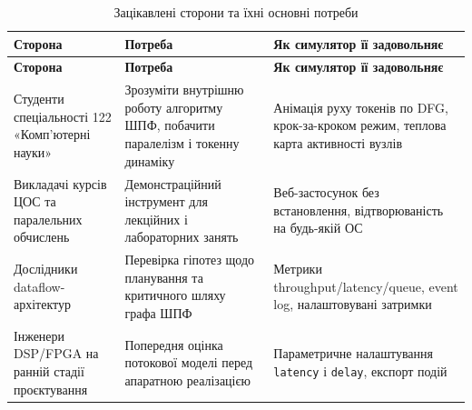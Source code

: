 \begin{longtable}[]{@{}
  >{\raggedright\arraybackslash}p{}
  >{\raggedright\arraybackslash}p{}
  >{\raggedright\arraybackslash}p{}@{}}
\caption[Зацікавлені сторони та їхні основні потреби]{Зацікавлені
сторони та їхні основні потреби}\tabularnewline
\toprule\noalign{}
\begin{minipage}[b]{\linewidth}\raggedright
\textbf{Сторона}
\end{minipage} & \begin{minipage}[b]{\linewidth}\raggedright
\textbf{Потреба}
\end{minipage} & \begin{minipage}[b]{\linewidth}\raggedright
\textbf{Як симулятор її задовольняє}
\end{minipage} \\
\midrule\noalign{}
\endfirsthead
\toprule\noalign{}
\begin{minipage}[b]{\linewidth}\raggedright
\textbf{Сторона}
\end{minipage} & \begin{minipage}[b]{\linewidth}\raggedright
\textbf{Потреба}
\end{minipage} & \begin{minipage}[b]{\linewidth}\raggedright
\textbf{Як симулятор її задовольняє}
\end{minipage} \\
\midrule\noalign{}
\endhead
\bottomrule\noalign{}
\endlastfoot
Студенти спеціальності 122 «Комп'ютерні науки» & Зрозуміти внутрішню
роботу алгоритму ШПФ, побачити паралелізм і токенну динаміку & Анімація
руху токенів по DFG, крок-за-кроком режим, теплова карта активності
вузлів \\
Викладачі курсів ЦОС та паралельних обчислень & Демонстраційний
інструмент для лекційних і лабораторних занять & Веб-застосунок без
встановлення, відтворюваність на будь-якій ОС \\
Дослідники dataflow-архітектур & Перевірка гіпотез щодо планування та
критичного шляху графа ШПФ & Метрики throughput/latency/queue, event
log, налаштовувані затримки \\
Інженери DSP/FPGA на ранній стадії проєктування & Попередня оцінка
потокової моделі перед апаратною реалізацією & Параметричне налаштування
\texttt{latency} і \texttt{delay}, експорт подій \\
\end{longtable}

